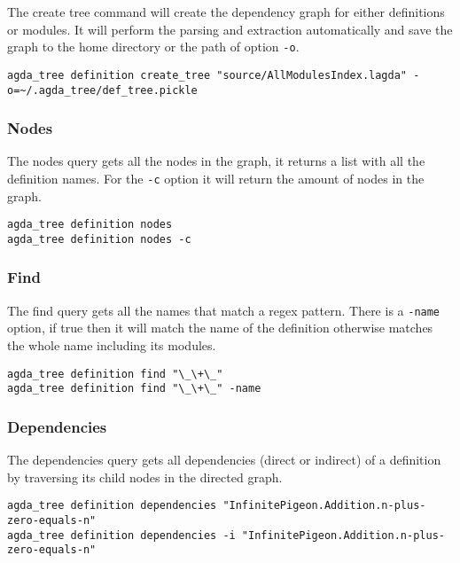 The create tree command will create the dependency graph for either definitions
or modules. It will perform the parsing and extraction automatically and save
the graph to the home directory or the path of option \texttt{-o}.

\begin{lstlisting}
agda_tree definition create_tree "source/AllModulesIndex.lagda" -o=~/.agda_tree/def_tree.pickle
\end{lstlisting}

\subsubsection{Nodes}

The nodes query gets all the nodes in the graph, it returns a list with all the
definition names. For the \texttt{-c} option it will return the amount of nodes
in the graph. 

\begin{lstlisting}
agda_tree definition nodes
agda_tree definition nodes -c
\end{lstlisting}

\subsubsection{Find}

The find query gets all the names that match a regex pattern. There is a
\texttt{-name} option, if true then it will match the name of the definition
otherwise matches the whole name including its modules.

\begin{lstlisting}
agda_tree definition find "\_\+\_"
agda_tree definition find "\_\+\_" -name
\end{lstlisting}

\subsubsection{Dependencies}

The dependencies query gets all dependencies (direct or indirect) of a
definition by traversing its child nodes in the directed graph.

\begin{lstlisting}
agda_tree definition dependencies "InfinitePigeon.Addition.n-plus-zero-equals-n"
agda_tree definition dependencies -i "InfinitePigeon.Addition.n-plus-zero-equals-n"
\end{lstlisting}

